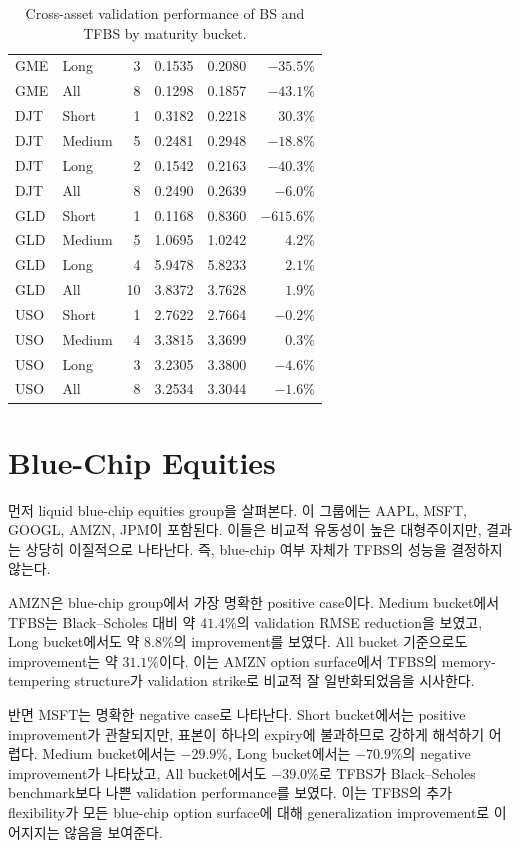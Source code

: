 \documentclass[11pt,a4paper]{report}
\begin{document}
\begin{table}[htbp]
\begin{tabular}{llrrrr}
GME & Long   & 3 & 0.1535 & 0.2080 & $-35.5\%$ \\
GME & All    & 8 & 0.1298 & 0.1857 & $-43.1\%$ \\
\midrule
DJT & Short  & 1 & 0.3182 & 0.2218 & $30.3\%$ \\
DJT & Medium & 5 & 0.2481 & 0.2948 & $-18.8\%$ \\
DJT & Long   & 2 & 0.1542 & 0.2163 & $-40.3\%$ \\
DJT & All    & 8 & 0.2490 & 0.2639 & $-6.0\%$ \\
\midrule
GLD & Short  & 1 & 0.1168 & 0.8360 & $-615.6\%$ \\
GLD & Medium & 5 & 1.0695 & 1.0242 & $4.2\%$ \\
GLD & Long   & 4 & 5.9478 & 5.8233 & $2.1\%$ \\
GLD & All    & 10 & 3.8372 & 3.7628 & $1.9\%$ \\
\midrule
USO & Short  & 1 & 2.7622 & 2.7664 & $-0.2\%$ \\
USO & Medium & 4 & 3.3815 & 3.3699 & $0.3\%$ \\
USO & Long   & 3 & 3.2305 & 3.3800 & $-4.6\%$ \\
USO & All    & 8 & 3.2534 & 3.3044 & $-1.6\%$ \\
\bottomrule
\end{tabular}
\caption{Cross-asset validation performance of BS and TFBS by maturity bucket.}
\label{tab:cross_asset_summary}
\end{table}

\section{Blue-Chip Equities}

먼저 liquid blue-chip equities group을 살펴본다. 이 그룹에는 AAPL, MSFT, GOOGL, AMZN, JPM이 포함된다. 이들은 비교적 유동성이 높은 대형주이지만, 결과는 상당히 이질적으로 나타난다. 즉, blue-chip 여부 자체가 TFBS의 성능을 결정하지 않는다.

AMZN은 blue-chip group에서 가장 명확한 positive case이다. Medium bucket에서 TFBS는 Black--Scholes 대비 약 $41.4\%$의 validation RMSE reduction을 보였고, Long bucket에서도 약 $8.8\%$의 improvement를 보였다. All bucket 기준으로도 improvement는 약 $31.1\%$이다. 이는 AMZN option surface에서 TFBS의 memory-tempering structure가 validation strike로 비교적 잘 일반화되었음을 시사한다.

반면 MSFT는 명확한 negative case로 나타난다. Short bucket에서는 positive improvement가 관찰되지만, 표본이 하나의 expiry에 불과하므로 강하게 해석하기 어렵다. Medium bucket에서는 $-29.9\%$, Long bucket에서는 $-70.9\%$의 negative improvement가 나타났고, All bucket에서도 $-39.0\%$로 TFBS가 Black--Scholes benchmark보다 나쁜 validation performance를 보였다. 이는 TFBS의 추가 flexibility가 모든 blue-chip option surface에 대해 generalization improvement로 이어지지는 않음을 보여준다.
\end{document}
